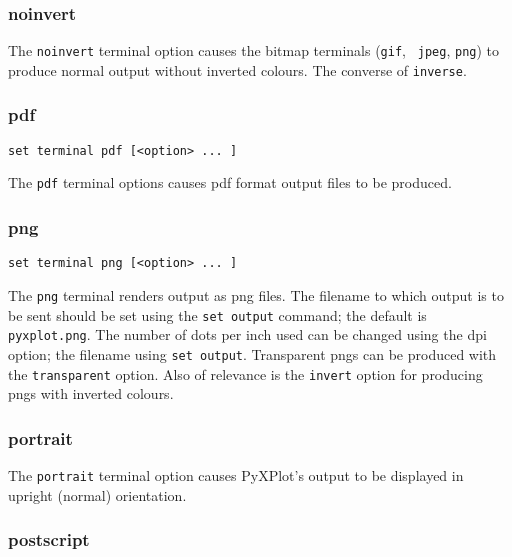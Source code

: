 \documentclass[a4paper,onecolumn,11pt]{book}
\begin{document}
\subsubsection{noinvert}

The {\tt noinvert} terminal option causes the bitmap terminals ({\tt gif}, {\tt
jpeg}, {\tt png}) to produce normal output without inverted colours. The
converse of {\tt inverse}.


\subsubsection{pdf}

\begin{verbatim}
set terminal pdf [<option> ... ]
\end{verbatim}

The {\tt pdf} terminal options causes pdf format output files to be produced.

\subsubsection{png}

\begin{verbatim}
set terminal png [<option> ... ]
\end{verbatim}

The {\tt png} terminal renders output as png files. The filename to which output
is to be sent should be set using the {\tt set output} command; the default is
{\tt pyxplot.png}. The number of dots per inch used can be changed using the dpi
option; the filename using {\tt set output}. Transparent pngs can be produced
with the {\tt transparent} option. Also of relevance is the {\tt invert} option
for producing pngs with inverted colours.


\subsubsection{portrait}

The {\tt portrait} terminal option causes PyXPlot's output to be displayed in
upright (normal) orientation.
 

\subsubsection{postscript}
\end{document}
